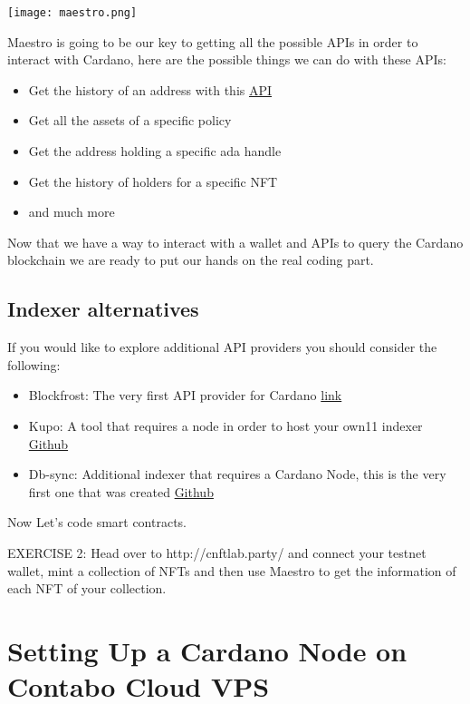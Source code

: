 \texttt{[image: maestro.png]}

Maestro is going to be our key to getting all the possible APIs in order to interact with Cardano, here are the possible things we can do with these APIs:

\begin{itemize}
    \item Get the history of an address with this \href{ttps://docs.gomaestro.org/Indexer-API/Addresses/txs-by-address}{API}
    \item Get all the assets of a specific policy 
    \item Get the address holding a specific ada handle
    \item Get the history of holders for a specific NFT 
    \item and much more 
\end{itemize}

Now that we have a way to interact with a wallet and APIs to query the Cardano blockchain we are ready to put our hands on the real coding part.

\subsection{Indexer alternatives}

If you would like to explore additional API providers you should consider the following:

\begin{itemize}
    \item Blockfrost: The very first API provider for Cardano \href{https://blockfrost.io/dashboard}{link}
    \item Kupo: A tool that requires a node in order to host your own11 indexer \href{https://github.com/CardanoSolutions/kupo}{Github}
    \item Db-sync: Additional indexer that requires a Cardano Node, this is the very first one that was created \href{https://github.com/IntersectMBO/cardano-db-sync}{Github}
\end{itemize}

Now Let's code smart contracts.

\begin{remark}
    EXERCISE 2: Head over to http://cnftlab.party/ and connect your testnet wallet, mint a collection of NFTs and then use Maestro to get the information of each NFT of your collection.
\end{remark}


\section{Setting Up a Cardano Node on Contabo Cloud VPS}

